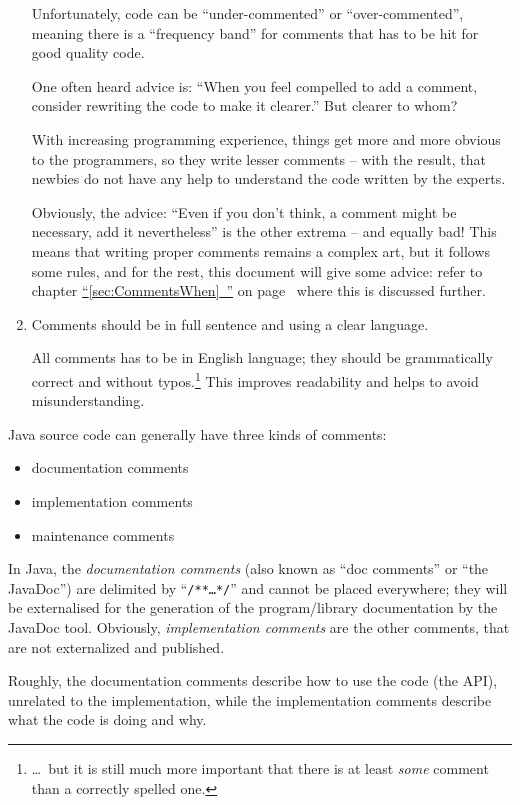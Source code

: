 \documentclass[11pt,a4paper, titlepage, parskip=half, headsepline, footsepline, cleardoublepage=current, headheight=1cm]{scrbook}
\newcommand*{\tqfullvref}[1]{\hyperref[{#1}]{“\ref*{#1}~\nameref*{#1}”} on page~\pageref{#1}}
\begin{document}
\begin{enumerate}[label=P\arabic*.]
{Unfortunately, code can be “under-commented” or “over-commented”, meaning there is a “frequency band” for comments that has to be hit for good quality code.

One often heard advice is: “When you feel compelled to add a comment, consider rewriting the code to make it clearer.” But clearer to whom?

With increasing programming experience, things get more and more obvious to the programmers, so they write lesser comments – with the result, that newbies do not have any help to understand the code written by the experts.

Obviously, the advice: “Even if you don't think, a comment might be necessary, add it nevertheless” is the other extrema – and equally bad! This means that writing proper comments remains a complex art, but it follows some rules, and for the rest, this document will give some advice: refer to chapter \tqfullvref{sec:CommentsWhen} where this is discussed further.}

\item{Comments should be in full sentence and using a clear language.

All comments has to be in English language; they should be grammatically correct and without typos.\footnote{…~but it is still much more important that there is at least \textit{some} comment than a correctly spelled one.} This improves readability and helps to avoid misunderstanding.}
\end{enumerate}

Java source code can generally have three kinds of comments:
\begin{itemize}[nosep]
\item{documentation comments}
\item{implementation comments}
\item{maintenance comments}
\end{itemize}

In Java, the \textit{documentation comments} (also known as “doc comments” or “the JavaDoc”) are delimited by “\verb#/**…*/#” and cannot be placed everywhere; they will be externalised for the generation of the program/library documentation by the JavaDoc tool. Obviously, \textit{implementation comments} are the other comments, that are not externalized and published.

Roughly, the documentation comments describe how to use the code (the API), unrelated to the implementation, while the implementation comments describe what the code is doing and why.
\end{document}
